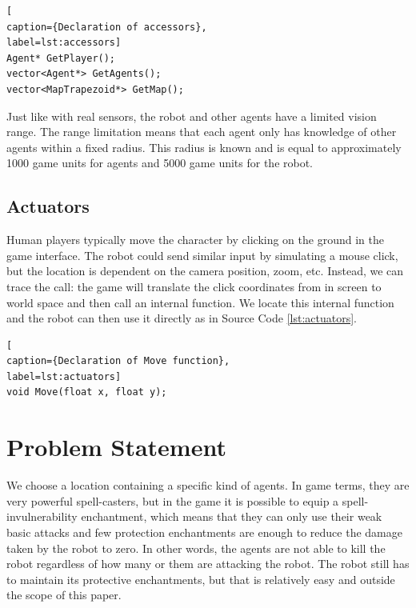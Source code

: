 \documentclass[]{article}
\begin{document}
\newpage
\begin{lstlisting}[
caption={Declaration of accessors},
label=lst:accessors]
Agent* GetPlayer();
vector<Agent*> GetAgents();
vector<MapTrapezoid*> GetMap();
\end{lstlisting}

Just like with real sensors, the robot and other agents have a limited vision range. The range limitation means that each agent only has knowledge of other agents within a fixed radius. This radius is known and is equal to approximately 1000 game units for agents and 5000 game units for the robot.

\subsection{Actuators}
Human players typically move the character by clicking on the ground in the game interface. The robot could send similar input by simulating a mouse click, but the location is dependent on the camera position, zoom, etc. Instead, we can trace the call: the game will translate the click coordinates from in screen to world space and then call an internal function. We locate this internal function and the robot can then use it directly as in Source Code \ref{lst:actuators}.

\begin{lstlisting}[
caption={Declaration of Move function},
label=lst:actuators]
void Move(float x, float y);
\end{lstlisting}

\section{Problem Statement}
We choose a location containing a specific kind of agents. In game terms, they are very powerful spell-casters, but in the game it is possible to equip a spell-invulnerability enchantment, which means that they can only use their weak basic attacks and few protection enchantments are enough to reduce the damage taken by the robot to zero. In other words, the agents are not able to kill the robot regardless of how many or them are attacking the robot. The robot still has to maintain its protective enchantments, but that is relatively easy and outside the scope of this paper. \\
\end{document}
